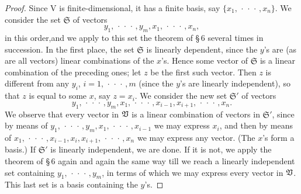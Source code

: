 \begin{proof}
    Since V is finite-dimensional, it has a finite basis, say \(\{x_1,
    \,\cdot\,\cdot\,\cdot\,, x_n\}\). We consider the set \(\mathfrak{S}\) of
    vectors
    \begin{equation*}
        y_1, \,\cdot\,\cdot\,\cdot\,, y_m, x_1, \,\cdot\,\cdot\,\cdot\,, x_n,
    \end{equation*}
    in this order,and we apply to this set the theorem of \S\,6 several times in
    succession. In the first place, the set \(\mathfrak{S}\) is linearly
    dependent, since the \(y\)'s are (as are all vectors) linear combinations of
    the \(x\)'s. Hence some vector of \(\mathfrak{S}\) is a linear combination
    of the preceding ones; let \(z\) be the first such vector. Then \(z\) is
    different from any \(y_i\), \(i = 1, \,\cdot\,\cdot\,\cdot\,, m\) (since the
    \(y\)'s are linearly independent), so that \(z\) is equal to some \(x\), say
    \(z = x_i\). We consider the new set \(\mathfrak{S}'\) of vectors
    \begin{equation*}
        y_1, \,\cdot\,\cdot\,\cdot\,, y_m, x_1, \,\cdot\,\cdot\,\cdot\,, x_{i-1}, x_{i+1}, \,\cdot\,\cdot\,\cdot\,, x_n.
    \end{equation*}
    We observe that every vector in \(\mathfrak{V}\) is a linear combination of
    vectors in \(\mathfrak{S}'\), since by means of \(y_1,
    \,\cdot\,\cdot\,\cdot\,, y_m, x_1, \,\cdot\,\cdot\,\cdot\,, x_{i-1}\) we may
    express \(x_i\), and then by means of \(x_1, \,\cdot\,\cdot\,\cdot\,,
    x_{i-1}, x_i, x_{i+1}, \,\cdot\,\cdot\,\cdot\,, x_n\) we may express any
    vector. (The \(x\)'s form a basis.) If \(\mathfrak{S}'\) is linearly
    independent, we are done. If it is not, we apply the theorem of \S\,6 again
    and again the same way till we reach a linearly independent set containing
    \(y_1, \,\cdot\,\cdot\,\cdot\,, y_m\), in terms of which we may express
    every vector in \(\mathfrak{V}\). This last set is a basis containing the \(y\)'s.
\end{proof}

